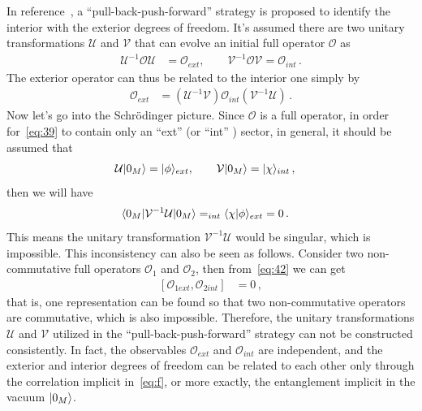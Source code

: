 \documentclass[12pt,a4paper]{article}
\begin{document}
In reference~\cite{g}, a ``pull-back-push-forward'' strategy is proposed to identify the interior
with the exterior degrees of freedom. It's assumed there are two unitary transformations $\mathcal {U}$ and
$\mathcal {V}$ that can evolve an initial full operator $\mathcal {O}$ as
\begin{equation}
\label{eq:42}
\begin{split}
\mathcal {U}^{-1}\mathcal {O}\mathcal {U} &= \mathcal
{O}_{ext},\qquad\mathcal {V}^{-1}\mathcal {O}\mathcal {V}=\mathcal
{O}_{int} \,.
\end{split}
\end{equation}
The exterior operator can thus be related to the interior one simply
by \cite{g}
\begin{equation}
\label{eq:43}
\begin{split}
\mathcal {O}_{ext} &= (\mathcal {U}^{-1}\mathcal {V})\mathcal
{O}_{int}(\mathcal {V}^{-1}\mathcal {U}) \,.
\end{split}
\end{equation}
Now let's go into the Schr\"odinger picture. Since $\mathcal {O}$ is
a full operator, in order for~\eqref{eq:39} to contain only an
``ext'' (or ``int'' ) sector, in general, it should be assumed that
\begin{equation}
\label{eq:44}
\begin{split}
\mathcal {U}\arrowvert0_M\rangle &=
\arrowvert\phi\rangle_{ext},\qquad\mathcal
{V}\arrowvert0_M\rangle=\arrowvert\chi\rangle_{int} \,,
\end{split}
\end{equation}
then we will have
\begin{equation}
\label{eq:45}
\begin{split}
\langle0_M\arrowvert\mathcal {V}^{-1}\mathcal
{U}\arrowvert0_M\rangle &=
_{int}\langle\chi\arrowvert\phi\rangle_{ext} = 0 \,.
\end{split}
\end{equation}
This means the unitary transformation $\mathcal {V}^{-1}\mathcal {U}$
would be singular, which is impossible. This inconsistency can also be
seen as follows. Consider two non-commutative full operators
$\mathcal {O}_1$ and $\mathcal {O}_2$, then from~\eqref{eq:42} we
can get
\begin{equation}
\label{eq:46}
\begin{split}
[\mathcal {O}_{1ext},\mathcal {O}_{2int}] &= 0 \,,
\end{split}
\end{equation}
that is, one representation can be found so that two
non-commutative operators are commutative, which is also impossible.
Therefore, the unitary transformations $\mathcal {U}$ and $\mathcal
{V}$ utilized in the ``pull-back-push-forward'' strategy can not be
constructed consistently. In fact, the observables $\mathcal {O}_{ext}$ and $\mathcal {O}_{int}$ are independent, and the exterior and interior degrees
of freedom can be related to each other only through the
correlation implicit in~\eqref{eq:f}, or more exactly, the entanglement implicit in the vacuum $\arrowvert0_M\rangle$.
\end{document}
